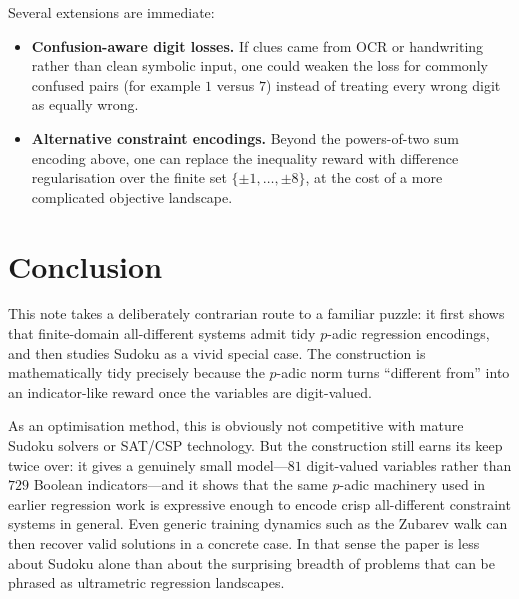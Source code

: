 \documentclass[11pt]{article}
\begin{document}
Several extensions are immediate:
\begin{itemize}
    \item \textbf{Confusion-aware digit losses.} If clues came from OCR or handwriting rather than clean symbolic input, one could weaken the loss for commonly confused pairs (for example $1$ versus $7$) instead of treating every wrong digit as equally wrong.
    \item \textbf{Alternative constraint encodings.} Beyond the powers-of-two sum encoding above, one can replace the inequality reward with difference regularisation over the finite set $\{\pm 1,\dots,\pm 8\}$, at the cost of a more complicated objective landscape.
\end{itemize}

\section{Conclusion}
This note takes a deliberately contrarian route to a familiar puzzle: it first shows that finite-domain all-different systems admit tidy $p$-adic regression encodings, and then studies Sudoku as a vivid special case. The construction is mathematically tidy precisely because the $p$-adic norm turns ``different from'' into an indicator-like reward once the variables are digit-valued.

As an optimisation method, this is obviously not competitive with mature Sudoku solvers or SAT/CSP technology. But the construction still earns its keep twice over: it gives a genuinely small model---$81$ digit-valued variables rather than $729$ Boolean indicators---and it shows that the same $p$-adic machinery used in earlier regression work is expressive enough to encode crisp all-different constraint systems in general. Even generic training dynamics such as the Zubarev walk can then recover valid solutions in a concrete case. In that sense the paper is less about Sudoku alone than about the surprising breadth of problems that can be phrased as ultrametric regression landscapes.
\end{document}
